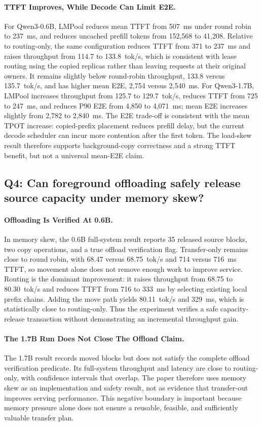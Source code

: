 \documentclass{article}
\newcommand{\sys}{LMPool}
\begin{document}
\paragraph{TTFT Improves, While Decode Can Limit E2E.} For Qwen3-0.6B, \sys{} reduces mean TTFT from 507~ms under round robin to 237~ms, and reduces uncached prefill tokens from 152,568 to 41,208. Relative to routing-only, the same configuration reduces TTFT from 371 to 237~ms and raises throughput from 114.7 to 133.8~tok/s, which is consistent with lease routing using the copied replicas rather than leaving requests at their original owners. It remains slightly below round-robin throughput, 133.8 versus 135.7~tok/s, and has higher mean E2E, 2,754 versus 2,540~ms. For Qwen3-1.7B, \sys{} increases throughput from 125.7 to 129.7~tok/s, reduces TTFT from 725 to 247~ms, and reduces P90 E2E from 4,850 to 4,071~ms; mean E2E increases slightly from 2,782 to 2,840~ms. The E2E trade-off is consistent with the mean TPOT increase: copied-prefix placement reduces prefill delay, but the current decode scheduler can incur more contention after the first token. The load-skew result therefore supports background-copy correctness and a strong TTFT benefit, but not a universal mean-E2E claim.

\subsection{Q4: Can foreground offloading safely release source capacity under memory skew?}

\paragraph{Offloading Is Verified At 0.6B.} In memory skew, the 0.6B full-system result reports 35 released source blocks, two copy operations, and a true offload verification flag. Transfer-only remains close to round robin, with 68.47 versus 68.75~tok/s and 714 versus 716~ms TTFT, so movement alone does not remove enough work to improve service. Routing is the dominant improvement: it raises throughput from 68.75 to 80.30~tok/s and reduces TTFT from 716 to 333~ms by selecting existing local prefix chains. Adding the move path yields 80.11~tok/s and 329~ms, which is statistically close to routing-only. Thus the experiment verifies a safe capacity-release transaction without demonstrating an incremental throughput gain.

\paragraph{The 1.7B Run Does Not Close The Offload Claim.} The 1.7B result records moved blocks but does not satisfy the complete offload verification predicate. Its full-system throughput and latency are close to routing-only, with confidence intervals that overlap. The paper therefore uses memory skew as an implementation and safety result, not as evidence that transfer-out improves serving performance. This negative boundary is important because memory pressure alone does not ensure a reusable, feasible, and sufficiently valuable transfer plan.
\end{document}
